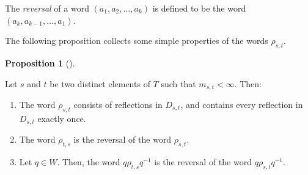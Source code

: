 \documentclass
[numbers=enddot,12pt,final,onecolumn,notitlepage,abstracton]{scrartcl}%
\theoremstyle{definition}
\newtheorem{prop}[theo]{Proposition}
\newenvironment{proposition}[1][]
{\begin{prop}[#1]\begin{leftbar}}
{\end{leftbar}\end{prop}}
\begin{document}
The \emph{reversal} of a word $\left(  a_{1},a_{2},\ldots,a_{k}\right)  $ is
defined to be the word $\left(  a_{k},a_{k-1},\ldots,a_{1}\right)  $.

The following proposition collects some simple properties of the words
$\rho_{s,t}$.

\begin{proposition}
\label{prop.rhost}Let $s$ and $t$ be two distinct elements of $T$ such that
$m_{s,t}<\infty$. Then:

\begin{enumerate}
\item[\textbf{(a)}] The word $\rho_{s,t}$ consists of reflections in $D_{s,t}%
$, and contains every reflection in $D_{s,t}$ exactly once.

\item[\textbf{(b)}] The word $\rho_{t,s}$ is the reversal of the word
$\rho_{s,t}$.

\item[\textbf{(c)}] Let $q\in W$. Then, the word $q\rho_{t,s}q^{-1}$ is the
reversal of the word $q\rho_{s,t}q^{-1}$.
\end{enumerate}
\end{proposition}
\end{document}
